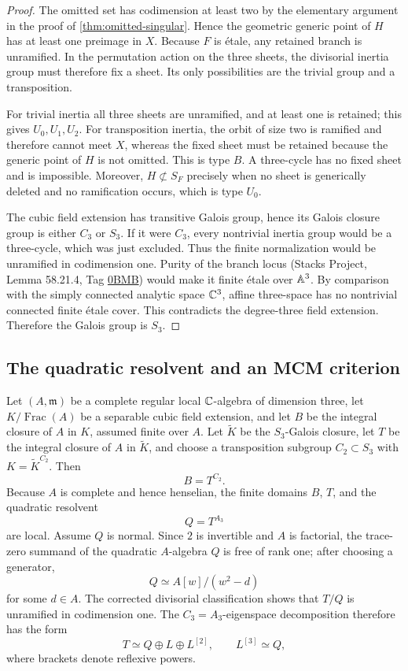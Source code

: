 \begin{proof}
The omitted set has codimension at least two by the elementary argument in the
proof of \cref{thm:omitted-singular}.  Hence the geometric generic point of
\(H\) has at least one preimage in \(X\).  Because \(F\) is étale, any
retained branch is unramified.  In the permutation action on the three sheets,
the divisorial inertia group must therefore fix a sheet.  Its only
possibilities are the trivial group and a transposition.

For trivial inertia all three sheets are unramified, and at least one is
retained; this gives \(U_0,U_1,U_2\).  For transposition inertia, the orbit of
size two is ramified and therefore cannot meet \(X\), whereas the fixed sheet
must be retained because the generic point of \(H\) is not omitted.  This is
type \(B\).  A three-cycle has no fixed sheet and is impossible.  Moreover,
\(H\not\subset S_F\) precisely when no sheet is generically deleted and no
ramification occurs, which is type \(U_0\).

The cubic field extension has transitive Galois group, hence its Galois
closure group is either \(C_3\) or \(S_3\).  If it were \(C_3\), every
nontrivial inertia group would be a three-cycle, which was just excluded.
Thus the finite normalization would be unramified in codimension one.  Purity
of the branch locus (Stacks Project, Lemma 58.21.4, Tag
\href{https://stacks.math.columbia.edu/tag/0BMB}{0BMB}) would make it finite
étale over \(\mathbb A^3\).  By comparison with the simply connected analytic
space \(\mathbb C^3\), affine three-space has no nontrivial connected finite
étale cover.  This contradicts the degree-three field extension.
Therefore the Galois group is \(S_3\).
\end{proof}

\subsection{The quadratic resolvent and an MCM criterion}

Let \((A,\mathfrak m)\) be a complete regular local \(\mathbb C\)-algebra of
dimension three, let \(K/\operatorname{Frac}(A)\) be a separable cubic field
extension, and let \(B\) be the integral closure of \(A\) in \(K\), assumed
finite over \(A\).  Let \(\widetilde K\) be the \(S_3\)-Galois closure, let
\(T\) be the integral closure of \(A\) in \(\widetilde K\), and choose a
transposition subgroup \(C_2\subset S_3\) with
\(K=\widetilde K^{C_2}\).  Then
\[
B=T^{C_2}.
\]
Because \(A\) is complete and hence henselian, the finite domains \(B\),
\(T\), and the quadratic resolvent
\[
Q=T^{A_3}
\]
are local.  Assume \(Q\) is normal.  Since \(2\) is invertible and \(A\) is
factorial, the trace-zero summand of the quadratic \(A\)-algebra \(Q\) is
free of rank one; after choosing a generator,
\[
Q\simeq A[w]/(w^2-d)
\]
for some \(d\in A\).  The corrected divisorial classification shows that
\(T/Q\) is unramified in codimension one.  The \(C_3=A_3\)-eigenspace
decomposition therefore has the form
\[
T\simeq Q\oplus L\oplus L^{[2]},
\qquad
L^{[3]}\simeq Q,
\]
where brackets denote reflexive powers.

